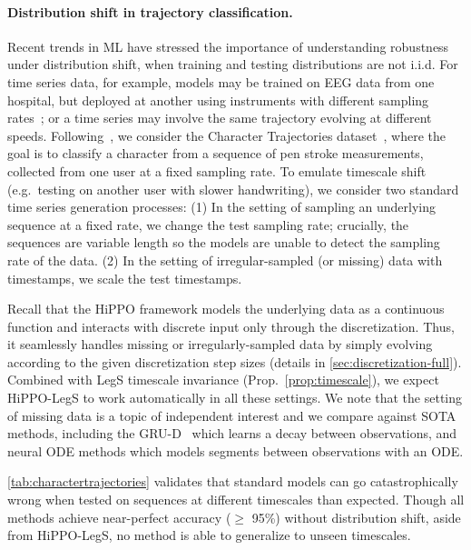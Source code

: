 \paragraph{Distribution shift in trajectory classification.}
Recent trends in ML have stressed the importance of understanding robustness under distribution shift, when training and testing distributions are not i.i.d.
For time series data, for example, models may be trained on EEG data from one hospital, but deployed at another using instruments with different sampling rates~\citep{shah2018temple, saab2020weak}; or a time series may involve the same trajectory evolving at different speeds.
Following~\citet{kidger2020neural}, we consider the Character Trajectories dataset~\citep{bagnall2018uea},
where the goal is to classify a character from a sequence of pen stroke measurements, collected from one user at a fixed sampling rate.
To emulate timescale shift (e.g.\ testing on another user with slower handwriting),
we consider two standard time series generation processes:
(1) In the setting of sampling an underlying sequence at a fixed rate, we change the test sampling rate; crucially, the sequences are variable length so the models are unable to detect the sampling rate of the data.
(2) In the setting of irregular-sampled (or missing) data with timestamps, we scale the test timestamps.





Recall that the HiPPO framework models the underlying data as a continuous function and interacts with discrete input only through the discretization.
Thus, it seamlessly handles missing or irregularly-sampled data by simply evolving according to the given discretization step sizes (details in \cref{sec:discretization-full}).
Combined with LegS timescale invariance (Prop.~\ref{prop:timescale}), we expect HiPPO-LegS to work automatically in all these settings.
We note that the setting of missing data is a topic of independent interest and we compare against SOTA methods, including the GRU-D~\cite{che2018recurrent} which learns a decay between observations,
and neural ODE methods which models segments between observations with an ODE.

\cref{tab:charactertrajectories} validates that standard models can go catastrophically wrong when tested on sequences at different timescales than expected.
Though all methods achieve near-perfect accuracy ($\geq$ 95\%) without distribution shift,
aside from HiPPO-LegS, no method is able to generalize to unseen timescales.




